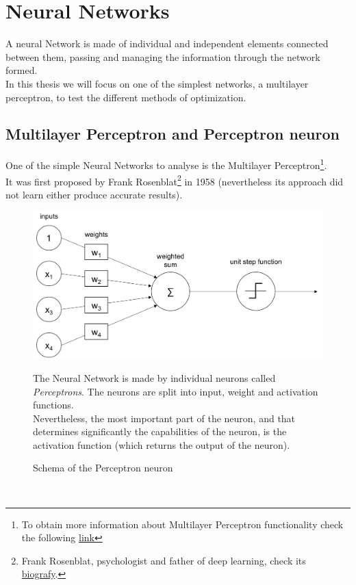 \documentclass[a4paper, 11pt]{article}
\begin{document}
\newpage
\section{Neural Networks} 
A neural Network is made of individual and independent elements connected between them, passing and managing the information through the network formed.\\
In this thesis we will focus on one of the simplest networks, a multilayer perceptron, to test the different methods of optimization.





\subsection{Multilayer Perceptron and Perceptron neuron}
One of the simple Neural Networks to analyse is the Multilayer Perceptron\footnote{To obtain more information about Multilayer Perceptron functionality check the following \href{https://en.wikipedia.org/wiki/Multilayer_perceptron}{link}}.\\
It was first proposed by Frank Rosenblat\footnote{Frank Rosenblat, psychologist and father of deep learning, check its \href{https://en.wikipedia.org/wiki/Frank_Rosenblat}{biografy}.} in 1958 (nevertheless its approach did not learn either produce accurate results).
\begin{figure}[h]
    \begin{minipage}{9cm}
        \begin{center}
            \includegraphics[width = 1 \textwidth]{Neural_Network/perceptron_schema.png}
            \caption{Schema of the Perceptron neuron}
        \end{center} 
    \end{minipage}
    \hspace{1em}
    \begin{minipage}{5cm}
        The Neural Network is made by individual neurons called \textit{Perceptrons}. The neurons are split into input, weight and activation functions.\\
        Nevertheless, the most important part of the neuron, and that determines significantly the capabilities of the neuron, is the activation function (which returns the output of the neuron).
    \end{minipage}
\end{figure}\\
\end{document}
